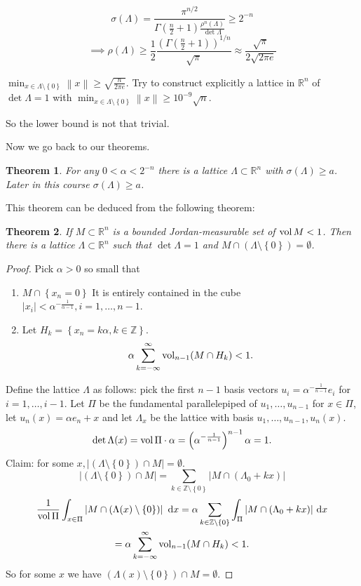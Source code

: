 \documentclass{report}
\newcommand{\R}{\mathbb{R}}
\newcommand{\Z}{\mathbb{Z}}
\newcommand{\idf}{\ \mathrm{d}}
\newcommand{\norm}[1]{\left\| #1 \right\|}
\newcommand{\set}[1]{\left\{ #1 \right\}}
\newcommand{\abs}[1]{\left| #1 \right|}
\newtheorem{theorem}{Theorem}[section]
\theoremstyle{definition}
\theoremstyle{remark}
\numberwithin{equation}{section}
\begin{document}
\[\sigma(\Lambda) = \frac{\pi^{n/2}}{\Gamma\left(\frac{n}{2}+1\right)\frac{\rho^n(\Lambda)}{\det \Lambda}} \geq 2^{-n}\]\[\implies \rho(\Lambda) \geq \frac{1}{2}\frac{\left(\Gamma\left(\frac{n}{2}+1\right)\right)^{1/n}}{\sqrt{\pi}} \approx \frac{\sqrt{\pi}}{2\sqrt{2\pi e}}\]

$\min_{x \in \Lambda\setminus \set{0}} \norm{x} \geq \sqrt{\frac{n}{2\pi e}}$. Try to construct explicitly a lattice in $\R^n$ of $\det \Lambda = 1$ with $\min_{x \in \Lambda \setminus \set{0}} \norm{x} \geq 10^{-9}\sqrt{n}$.

So the lower bound is not that trivial.

Now we go back to our theorems.
\begin{theorem}
    For any $0 < \alpha < 2^{-n}$ there is a lattice $\Lambda \subset  \R^n$ with $\sigma(\Lambda) \geq a$. Later in this course $\sigma (\Lambda) \geq a$.
\end{theorem}
This theorem can be deduced from the following theorem:
\begin{theorem}
    If $M \subset \R^n$ is a bounded Jordan-measurable set of $\operatorname{vol} M < 1$. Then there is a lattice $\Lambda \subset \R^n$ such that $\det \Lambda = 1$ and $M \cap (\Lambda \setminus \set{0}) = \emptyset$.
\end{theorem}
\begin{proof}
    Pick $\alpha > 0$ so small that \begin{enumerate}
        \item $M \cap \set{x_n = 0}$ It is entirely contained in the cube $|x_i| < \alpha^{-\frac{1}{\alpha-1}}, i = 1, \ldots, n-1$.
        \item Let $H_k = \set{x_n = k\alpha, k \in \Z}$. \[\alpha \sum_{k=-\infty}^\infty \operatorname{vol}_{n-1}(M \cap H_k) < 1.\]
    \end{enumerate}
    Define the lattice $\Lambda$ as follows: pick the first $n - 1$ basis vectors $u_i = \alpha^{-\frac{1}{n-1}}e_i$ for $i = 1, \ldots, i-1$.
    Let $\Pi$ be the fundamental parallelepiped of $u_1, \ldots, u_{n-1}$ for $x \in \Pi$, let $u_n(x) = \alpha e_n + x$ and let $\Lambda_x$ be the lattice with basis $u_1, \ldots, u_{n-1}, u_n(x)$. 
    \[\det \Lambda(x) = \operatorname{vol} \Pi \cdot \alpha = \left(\alpha^{-\frac{1}{n-1}}\right)^{n-1}\alpha = 1.\]
    Claim: for some $x, |(\Lambda \setminus \set{0}) \cap M| = \emptyset$.
    \[|(\Lambda \setminus \set{0}) \cap M| = \sum_{k \in \Z \setminus \set{0}} |M \cap (\Lambda_0 + kx)|\]
    \begin{multline*}\frac{1}{\vol\Pi}\int_{x \in \Pi} \abs{M \cap (\Lambda(x) \setminus \set{0})} \idf x= \alpha \sum_{k \in \Z \setminus \set{0}} \int_\Pi |M\cap(\Lambda_0 + kx)| \idf x \\ = \alpha \sum_{k=-\infty}^\infty \vol_{n-1}(M \cap H_k) < 1.\end{multline*}
    So for some $x$ we have $(\Lambda(x) \setminus \set{0}) \cap M = \emptyset$.
\end{proof}
\end{document}
